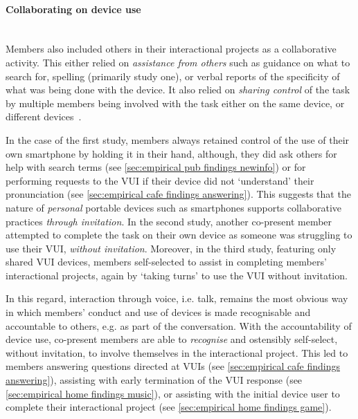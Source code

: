 \begin{revisedsubmission}
\paragraph{Collaborating on device use} \hfill \\
Members also included others in their interactional projects as a collaborative activity.
This either relied on \textit{assistance from others} such as guidance on what to search for, spelling (primarily study one), or verbal reports of the specificity of what was being done with the device.
It also relied on \textit{sharing control} of the task by multiple members being involved with the task either on the same device, or different devices~\citep{Brown2015}.

In the case of the first study, members always retained control of the use of their own smartphone by holding it in their hand, although, they did ask others for help with search terms (see \ref{sec:empirical pub findings newinfo}) or for performing requests to the \ac{VUI} if their device did not `understand' their pronunciation (see \ref{sec:empirical cafe findings answering}).
This suggests that the nature of \textit{personal} portable devices such as smartphones supports collaborative practices \textit{through invitation}.
In the second study, another co-present member attempted to complete the task on their own device as someone was struggling to use their \ac{VUI}, \textit{without invitation}.
Moreover, in the third study, featuring only shared \ac{VUI} devices, members self-selected to assist in completing members' interactional projects, again by `taking turns' to use the \ac{VUI} without invitation.

In this regard, interaction through voice, i.e. talk, remains the most obvious way in which members' conduct and use of devices is made recognisable and accountable to others, e.g. as part of the conversation.
With the accountability of device use, co-present members are able to \textit{recognise} and ostensibly self-select, without invitation, to involve themselves in the interactional project.
This led to members answering questions directed at \acp{VUI} (see \ref{sec:empirical cafe findings answering}), assisting with early termination of the \ac{VUI} response (see \ref{sec:empirical home findings music}), or assisting with the initial device user to complete their interactional project (see \ref{sec:empirical home findings game}).


\end{revisedsubmission}
